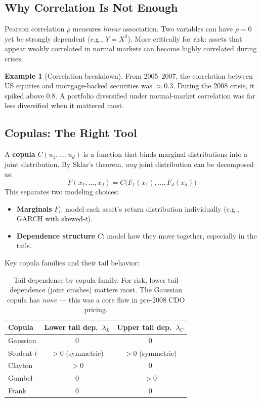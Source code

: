 \documentclass[11pt, a4paper]{article}
\theoremstyle{definition}
\newtheorem{example}{Example}[section]
\theoremstyle{plain}
\theoremstyle{remark}
\begin{document}
\subsection{Why Correlation Is Not Enough}

Pearson correlation $\rho$ measures \emph{linear} association.
Two variables can have $\rho = 0$ yet be strongly dependent (e.g., $Y = X^2$).
More critically for risk: assets that appear weakly correlated in normal markets can become highly correlated during crises.

\begin{example}[Correlation breakdown]
From 2005--2007, the correlation between US equities and mortgage-backed securities was $\approx 0.3$.
During the 2008 crisis, it spiked above $0.8$.
A portfolio diversified under normal-market correlation was far less diversified when it mattered most.
\end{example}

\subsection{Copulas: The Right Tool}

A \textbf{copula} $C(u_1, \ldots, u_d)$ is a function that binds marginal distributions into a joint distribution.
By Sklar's theorem, \emph{any} joint distribution can be decomposed as:
\[
    F(x_1, \ldots, x_d) = C\bigl(F_1(x_1), \ldots, F_d(x_d)\bigr)
\]
This separates two modeling choices:
\begin{itemize}
    \item \textbf{Marginals} $F_i$: model each asset's return distribution individually (e.g., GARCH with skewed-$t$).
    \item \textbf{Dependence structure} $C$: model how they move together, especially in the tails.
\end{itemize}

Key copula families and their tail behavior:

\begin{table}[H]
\centering
\begin{tabular}{@{}lcc@{}}
\toprule
\textbf{Copula} & \textbf{Lower tail dep.}\ $\lambda_L$ & \textbf{Upper tail dep.}\ $\lambda_U$ \\
\midrule
Gaussian       & 0 & 0 \\
Student-$t$    & $> 0$ (symmetric) & $> 0$ (symmetric) \\
Clayton        & $> 0$ & 0 \\
Gumbel         & 0 & $> 0$ \\
Frank          & 0 & 0 \\
\bottomrule
\end{tabular}
\caption{Tail dependence by copula family. For risk, lower tail dependence (joint crashes) matters most. The Gaussian copula has \emph{none} --- this was a core flaw in pre-2008 CDO pricing.}
\end{table}
\end{document}
